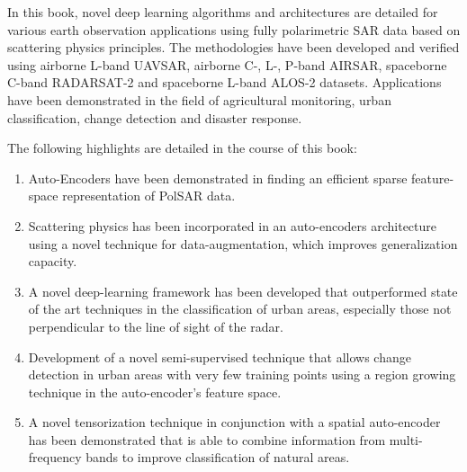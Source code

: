 In this book, novel deep learning algorithms and architectures are detailed for various earth observation applications using fully polarimetric SAR data based on scattering physics principles.
The methodologies have been developed and verified using airborne L-band UAVSAR, airborne C-, L-, P-band AIRSAR, spaceborne C-band RADARSAT-2 and spaceborne L-band ALOS-2 datasets. Applications have been demonstrated in the field of agricultural monitoring, urban classification, change detection and disaster response. 

The following highlights are detailed in the course of this book:

\begin{enumerate}
\item Auto-Encoders have been demonstrated in finding an efficient sparse feature-space representation of PolSAR data.
\item Scattering physics has been incorporated in an auto-encoders architecture using a novel technique for data-augmentation, which improves generalization capacity. 
\item A novel deep-learning framework has been developed that outperformed state of the art techniques in the classification of urban areas, especially those not perpendicular to the line of sight of the radar.
\item Development of a novel semi-supervised technique that allows change detection in urban areas with very few training points using a region growing technique in the auto-encoder's feature space. 
\item A novel tensorization technique in conjunction with a spatial auto-encoder has been demonstrated that is able to combine information from multi-frequency bands to improve classification of natural areas. 
\end{enumerate}


